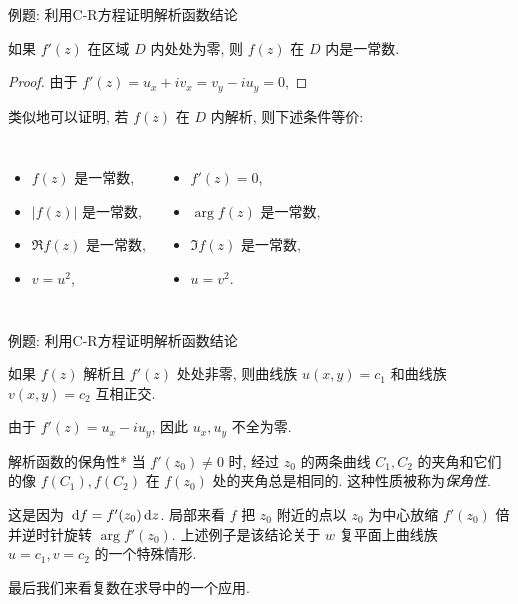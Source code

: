 \begin{frame}[<*>]{例题: 利用C-R方程证明解析函数结论}
\onslide<+->
\begin{example}
如果 $f'(z)$ 在区域 $D$ 内处处为零, 则 $f(z)$ 在 $D$ 内是一常数.
\end{example}
\onslide<+->
\begin{proof}
由于 $f'(z)=u_x+iv_x=v_y-iu_y=0$,
\end{proof}
\onslide<+->
类似地可以证明, 若 $f(z)$ 在 $D$ 内解析, 则下述条件等价:
\onslide<+->
\begin{columns}
		\begin{itemize}
		\item $f(z)$ 是一常数,
		\item $|f(z)|$ 是一常数,
		\item $\Re{f(z)}$ 是一常数,
		\item $v=u^2$,
		\end{itemize}
		\begin{itemize}
		\item $f'(z)=0$,
		\item $\arg{f(z)}$ 是一常数,
		\item $\Im{f(z)}$ 是一常数,
		\item $u=v^2$.
		\end{itemize}
\end{columns}
\end{frame}


\begin{frame}{例题: 利用C-R方程证明解析函数结论}
\onslide<+->
\begin{example}
如果 $f(z)$ 解析且 $f'(z)$ 处处非零, 则曲线族 $u(x,y)=c_1$ 和曲线族 $v(x,y)=c_2$ 互相正交.
\end{example}
\onslide<+->
\begin{proof*}
由于 $f'(z)=u_x-iu_y$, 因此 $u_x,u_y$ 不全为零.

\end{proof*}
\end{frame}


\begin{frame}{解析函数的保角性*}
\onslide<+->
当 $f'(z_0)\neq 0$ 时, 
\onslide<+->
经过 $z_0$ 的两条曲线 $C_1,C_2$ 的夹角和它们的像 $f(C_1),f(C_2)$ 在 $f(z_0)$ 处的夹角总是相同的.
\onslide<+->
这种性质被称为\emph{保角性}.

\onslide<+->
这是因为 $\,\mathrm{d} f=f'(z_0)\,\mathrm{d} z$.
\onslide<+->
局部来看 $f$ 把 $z_0$ 附近的点以 $z_0$ 为中心放缩 $f'(z_0)$ 倍并逆时针旋转 $\arg{f'(z_0)}$.
\onslide<+->
上述例子是该结论关于 $w$ 复平面上曲线族 $u=c_1,v=c_2$ 的一个特殊情形.

\onslide<+->
最后我们来看复数在求导中的一个应用.
\end{frame}


